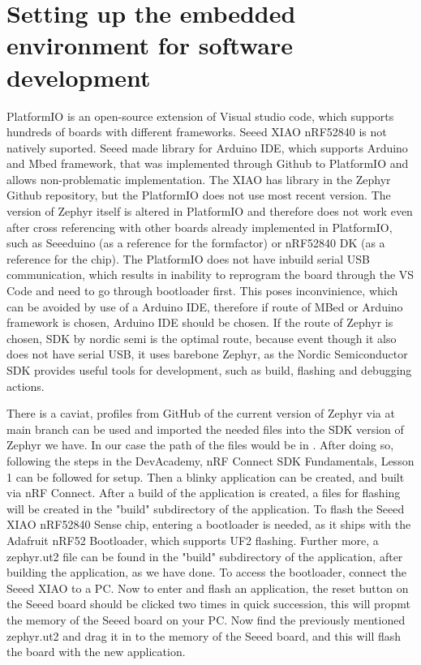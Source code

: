 \section{Setting up the embedded environment for software development}\label{zephyr}
PlatformIO is an open-source extension of Visual studio code, which supports hundreds of boards with different frameworks. \cite{Platform} Seeed XIAO nRF52840 is not natively suported. Seeed made library for Arduino IDE, which supports Arduino and Mbed framework, that was implemented through Github to PlatformIO and allows non-problematic implementation.
The XIAO has library in the Zephyr Github repository, but the PlatformIO does not use most recent version. The version of Zephyr itself is altered in PlatformIO and therefore does not work even after cross referencing with other boards already implemented in PlatformIO, such as Seeeduino (as a reference for the formfactor) or nRF52840 DK (as a reference for the chip).
The PlatformIO does not have inbuild serial USB communication, which results in inability to reprogram the board through the VS Code and need to go through bootloader first. This poses inconvinience, which can be avoided by use of a Arduino IDE, therefore if route of MBed or Arduino framework is chosen, Arduino IDE should be chosen. If the route of Zephyr is chosen, SDK by nordic semi is the optimal route, because event though it also does not have serial USB, it uses barebone Zephyr, as the Nordic Semiconductor SDK provides useful tools for development, such as build, flashing and debugging actions. \cite{nRF}

There is a caviat, profiles from GitHub of the current version of Zephyr via  at main branch \cite{gitZephyr} can be used and imported the needed files into the SDK version of Zephyr we have.
In our case the path of the files would be in  .
After doing so, following the steps in the DevAcademy, nRF Connect SDK Fundamentals, Lesson 1 can be followed for setup. Then a blinky application can be created, and built via nRF Connect.
After a build of the application is created, a files for flashing will be created in the "build" subdirectory of the application.
To flash the Seeed XIAO nRF52840 Sense chip, entering a bootloader is needed, as it ships with the Adafruit nRF52 Bootloader, which supports UF2 flashing. \cite{docsZephyr}
Further more, a zephyr.ut2 file can be found in the "build" subdirectory of the application, after building the application, as we have done.
To access the bootloader, connect the Seeed XIAO to a PC.
Now to enter and flash an application, the reset button on the Seeed board should be clicked two times in quick succession, this will propmt the memory of the Seeed board on your PC.
Now find the previously mentioned zephyr.ut2 and drag it in to the memory of the Seeed board, and this will flash the board with the new application.

